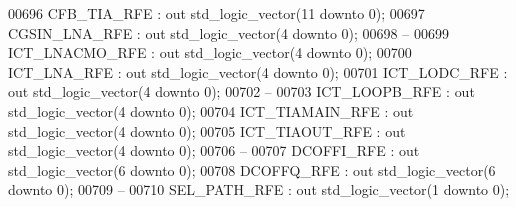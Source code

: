 \begin{DoxyCode}
00696         CFB\_TIA\_RFE     : \textcolor{keywordflow}{out} \textcolor{comment}{std\_logic\_vector}(\textcolor{vhdllogic}{}\textcolor{vhdllogic}{11} \textcolor{keywordflow}{downto} \textcolor{vhdllogic}{}\textcolor{vhdllogic}{0});
00697         CGSIN\_LNA\_RFE   : \textcolor{keywordflow}{out} \textcolor{comment}{std\_logic\_vector}(\textcolor{vhdllogic}{}\textcolor{vhdllogic}{4} \textcolor{keywordflow}{downto} \textcolor{vhdllogic}{}\textcolor{vhdllogic}{0});
00698 \textcolor{keyword}{        --}
00699         ICT\_LNACMO\_RFE  : \textcolor{keywordflow}{out} \textcolor{comment}{std\_logic\_vector}(\textcolor{vhdllogic}{}\textcolor{vhdllogic}{4} \textcolor{keywordflow}{downto} \textcolor{vhdllogic}{}\textcolor{vhdllogic}{0});
00700         ICT\_LNA\_RFE     : \textcolor{keywordflow}{out} \textcolor{comment}{std\_logic\_vector}(\textcolor{vhdllogic}{}\textcolor{vhdllogic}{4} \textcolor{keywordflow}{downto} \textcolor{vhdllogic}{}\textcolor{vhdllogic}{0});
00701         ICT\_LODC\_RFE    : \textcolor{keywordflow}{out} \textcolor{comment}{std\_logic\_vector}(\textcolor{vhdllogic}{}\textcolor{vhdllogic}{4} \textcolor{keywordflow}{downto} \textcolor{vhdllogic}{}\textcolor{vhdllogic}{0});
00702 \textcolor{keyword}{        --}
00703         ICT\_LOOPB\_RFE       : \textcolor{keywordflow}{out} \textcolor{comment}{std\_logic\_vector}(\textcolor{vhdllogic}{}\textcolor{vhdllogic}{4} \textcolor{keywordflow}{downto} \textcolor{vhdllogic}{}\textcolor{vhdllogic}{0});
00704         ICT\_TIAMAIN\_RFE : \textcolor{keywordflow}{out} \textcolor{comment}{std\_logic\_vector}(\textcolor{vhdllogic}{}\textcolor{vhdllogic}{4} \textcolor{keywordflow}{downto} \textcolor{vhdllogic}{}\textcolor{vhdllogic}{0});
00705         ICT\_TIAOUT\_RFE  : \textcolor{keywordflow}{out} \textcolor{comment}{std\_logic\_vector}(\textcolor{vhdllogic}{}\textcolor{vhdllogic}{4} \textcolor{keywordflow}{downto} \textcolor{vhdllogic}{}\textcolor{vhdllogic}{0});
00706 \textcolor{keyword}{        --}
00707         DCOFFI\_RFE  : \textcolor{keywordflow}{out} \textcolor{comment}{std\_logic\_vector}(\textcolor{vhdllogic}{}\textcolor{vhdllogic}{6} \textcolor{keywordflow}{downto} \textcolor{vhdllogic}{}\textcolor{vhdllogic}{0});
00708         DCOFFQ\_RFE  : \textcolor{keywordflow}{out} \textcolor{comment}{std\_logic\_vector}(\textcolor{vhdllogic}{}\textcolor{vhdllogic}{6} \textcolor{keywordflow}{downto} \textcolor{vhdllogic}{}\textcolor{vhdllogic}{0});
00709 \textcolor{keyword}{        --}
00710         SEL\_PATH\_RFE    : \textcolor{keywordflow}{out} \textcolor{comment}{std\_logic\_vector}(\textcolor{vhdllogic}{}\textcolor{vhdllogic}{1} \textcolor{keywordflow}{downto} \textcolor{vhdllogic}{}\textcolor{vhdllogic}{0});

\end{DoxyCode}
